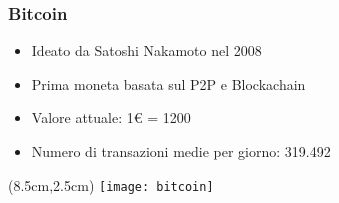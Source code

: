 \begin{frame}
 \frametitle{Bitcoin}
 
 \begin{itemize}
  \item<1-> Ideato da Satoshi Nakamoto nel 2008
  \item<2-> Prima moneta basata sul P2P e Blockachain%
  \item<3-> Valore attuale: 1\euro{} =  1200\bitcoin{}
  \item<4-> Numero di transazioni medie per giorno: 319.492
 \end{itemize}

 
 
 \begin{textblock*}{5cm}(8.5cm,2.5cm)
  \texttt{[image: bitcoin]}
 \end{textblock*}
 
\end{frame}
